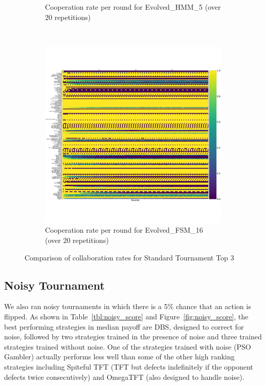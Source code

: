 \documentclass{article}
\begin{document}
\begin{figure}[!hbtp]
\begin{subfigure}[t]{.3\textwidth}
        \caption{Cooperation rate per round for Evolved\_HMM\_5 (over 20
        repetitions)}
    \end{subfigure}%
    ~
    \begin{subfigure}[t]{.3\textwidth}
        \centering
        \includegraphics[width=\textwidth]{./assets/cooperation_0_0_20_Evolved_FSM_16_array.pdf}
        \caption{Cooperation rate per round for Evolved\_FSM\_16 (over 20
        repetitions)}
    \end{subfigure}%

    \caption{Comparison of collaboration rates for Standard Tournament Top 3}
    \label{fig:comparison_cooperation_heatmaps_standard}
\end{figure}


\subsection{Noisy Tournament}

We also ran noisy tournaments in which there is a 5\% chance that an action is
flipped. As shown in Table~\ref{tbl:noisy_score} and
Figure~\ref{fig:noisy_score}, the best performing strategies in median payoff
are DBS, designed to correct for noise, followed by two strategies trained in
the presence of noise and three trained strategies trained without noise. One of
the strategies trained with noise (PSO Gambler) actually performs less well than
some of the other high ranking strategies including
Spiteful TFT (TFT but defects indefinitely if the opponent defects twice
consecutively) and OmegaTFT (also designed to handle noise).
\end{document}
